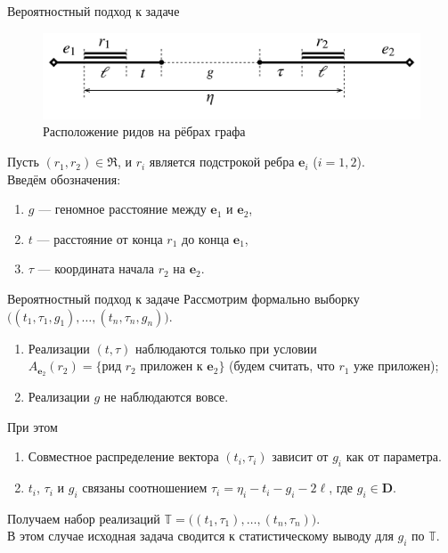 \documentclass[unicode, notheorems]{beamer}
\begin{document}
\begin{frame}{Вероятностный подход к задаче}
	\begin{figure}	
		\centering
		\includegraphics[scale=0.05]{img/alignment_shifted}
		\caption{Расположение ридов на рёбрах графа}
	\end{figure}

	Пусть $(r_1, r_2) \in \mathfrak{R}$, и $r_i$ является подстрокой ребра $\mathbf{e}_i$ ($i=1,2$). \\
	\medskip
	Введём обозначения: 
	\begin{enumerate}
		\item $g$ --- геномное расстояние между $\mathbf{e}_1$ и $\mathbf{e}_2$,
		\item $t$ --- расстояние от конца $r_1$ до конца $\mathbf{e}_1$,
		\item $\tau$ --- координата начала $r_2$ на $\mathbf{e}_2$.
	\end{enumerate}
\end{frame}

\begin{frame}{Вероятностный подход к задаче}
	Рассмотрим формально выборку $\Big( (t_1, \tau_1, g_1), \ldots, (t_n, \tau_n, g_n) \Big)$.
	\begin{enumerate}
		\item Реализации $(t, \tau)$ наблюдаются только при условии $A_{\mathbf{e}_2}(r_2) = \{\text{рид } r_2 \text{ приложен к } \mathbf{e}_2\}$ (будем считать, что $r_1$ уже приложен);
		\item Реализации $g$ не наблюдаются вовсе.
	\end{enumerate}
	\smallskip
	При этом
	\begin{enumerate}
		\item Совместное распределение вектора $(t_i, \tau_i)$ зависит от $g_i$ как от параметра.
		\item $t_i$, $\tau_i$ и $g_i$ связаны соотношением $\tau_i = \eta_i - t_i - g_i - 2\ell$, где $g_i  \in \mathbf{D}$.
	\end{enumerate}
	\smallskip
	Получаем набор реализаций $\mathbb{T} = \Big( (t_1, \tau_1), \ldots, (t_n, \tau_n) \Big)$.\\
	\medskip
	{\color{blue} В этом случае исходная задача сводится к статистическому выводу для $g_i$ по $\mathbb{T}$.}
\end{frame}
\end{document}
